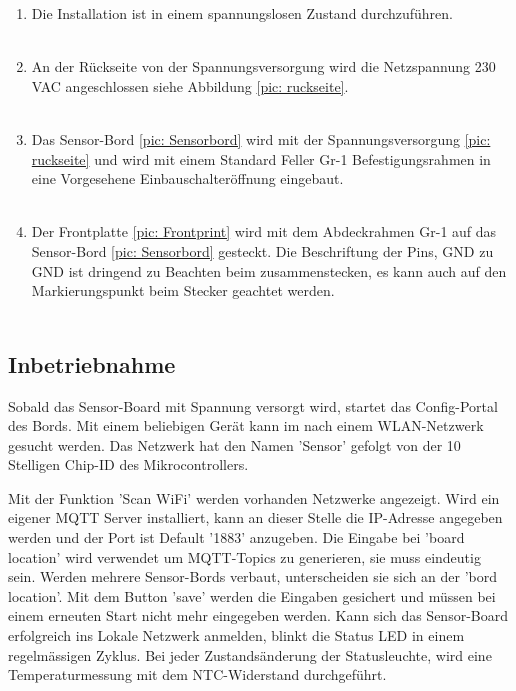 \begin{enumerate}
	\item Die Installation ist in einem spannungslosen Zustand durchzuführen.\\
	\\
	\item An der Rückseite von der Spannungsversorgung wird die Netzspannung 230\,VAC angeschlossen siehe Abbildung \ref{pic: ruckseite}.\\
	\\
	\item Das Sensor-Bord \ref{pic: Sensorbord} wird mit der Spannungsversorgung \ref{pic: ruckseite} und wird mit einem Standard Feller Gr-1 Befestigungsrahmen in eine Vorgesehene Einbauschalteröffnung eingebaut. \\
	\\
	\item Der Frontplatte \ref{pic: Frontprint} wird mit dem Abdeckrahmen Gr-1 auf das Sensor-Bord \ref{pic: Sensorbord} gesteckt. Die Beschriftung der Pins, GND zu GND ist dringend zu Beachten beim zusammenstecken, es kann auch auf den Markierungspunkt beim Stecker geachtet werden.\\
	\\
	\end{enumerate}

\subsection{Inbetriebnahme}
Sobald das Sensor-Board mit Spannung versorgt wird, startet das Config-Portal des Bords. Mit einem beliebigen Gerät kann im nach einem WLAN-Netzwerk gesucht werden. Das Netzwerk hat den Namen 'Sensor' gefolgt von der 10 Stelligen Chip-ID des Mikrocontrollers. 

Mit der Funktion 'Scan WiFi' werden vorhanden Netzwerke angezeigt. Wird ein eigener MQTT Server installiert, kann an dieser Stelle die IP-Adresse angegeben werden und der Port ist Default '1883' anzugeben. Die Eingabe bei 'board location' wird verwendet um MQTT-Topics zu generieren, sie muss eindeutig sein. Werden mehrere Sensor-Bords verbaut, unterscheiden sie sich an der 'bord location'. Mit dem Button 'save' werden die Eingaben gesichert und müssen bei einem erneuten Start nicht mehr eingegeben werden. Kann sich das Sensor-Board erfolgreich ins Lokale Netzwerk anmelden, blinkt die Status LED in einem regelmässigen Zyklus. Bei jeder Zustandsänderung der Statusleuchte, wird eine Temperaturmessung mit dem NTC-Widerstand durchgeführt. 

